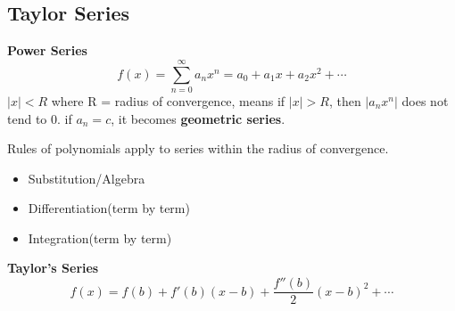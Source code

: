 \documentclass{article}
\begin{document}
\subsection{Taylor Series}
\textbf{Power Series}
$$f(x) = \sum_{n=0}^\infty a_nx^n = a_0 + a_1x + a_2x^2 + \cdots$$
$|x| < R$ where R = radius of convergence, means if $|x| > R$, then $|a_nx^n|$ does not tend to 0. if $a_n = c$, it becomes \textbf{geometric series}.

Rules of polynomials apply to series within the radius of convergence.
\begin{itemize}
  \item Substitution/Algebra
  \item Differentiation(term by term)
  \item Integration(term by term)
\end{itemize}

\textbf{Taylor's Series}
$$f(x) = f(b) + f'(b)(x-b) + \frac{f''(b)}{2}(x-b)^2 + \cdots $$
\end{document}
